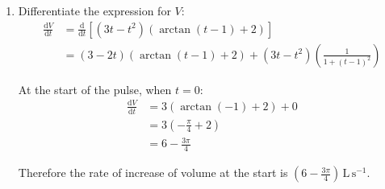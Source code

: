 \documentclass[leqno]{article}
\begin{document}
\begin{enumerate}[
  label=\textbf{\arabic*.},
  leftmargin=*,
  topsep=0pt,
  partopsep=0pt,
  parsep=0pt
]
\begin{djsSolution}
\begin{enumerate}[label=\textbf{(\alph*)}]
  Now
  \[
  -\frac{\pi}{2}<\arctan(t-1)<\frac{\pi}{2}
  \]

  so
  \[
  2-\frac{\pi}{2}<\arctan(t-1)+2<2+\frac{\pi}{2}
  \]

  Since \(2-\frac{\pi}{2}>0\), the factor \(\arctan(t-1)+2\) is never zero. Hence
  \[
  3t-t^2=0
  \]

  so
  \begin{align*}
  t(3-t)&=0 \\
  t&=0 \text{ or } t=3
  \end{align*}

  The pulse starts at \(t=0\), so it ends when \(t=3\). Therefore the pulse lasts \(3\) seconds.

  \item Differentiate the expression for \(V\):
  \begin{align*}
  \frac{\mathrm{d}V}{\mathrm{d}t}
  &= \frac{\mathrm{d}}{\mathrm{d}t}\left[(3t-t^2)\left(\arctan(t-1)+2\right)\right] \\
  &= (3-2t)\left(\arctan(t-1)+2\right)+(3t-t^2)\left(\frac{1}{1+(t-1)^2}\right)
  \end{align*}

  At the start of the pulse, when \(t=0\):
  \begin{align*}
  \frac{\mathrm{d}V}{\mathrm{d}t}
  &= 3\left(\arctan(-1)+2\right)+0 \\
  &= 3\left(-\frac{\pi}{4}+2\right) \\
  &= 6-\frac{3\pi}{4}
  \end{align*}

  Therefore the rate of increase of volume at the start is \(\left(6-\frac{3\pi}{4}\right)\,\mathrm{L\,s^{-1}}\).
\end{enumerate}
\end{djsSolution}


\newpage

\questionitem


\end{enumerate}
\end{document}
